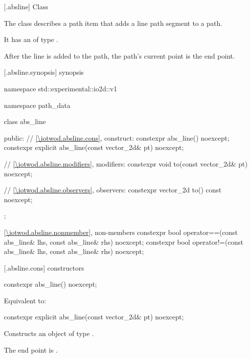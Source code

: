  [\iotwod.absline] {Class }

\pnum
{}%
The class  describes a path item that adds a line path segment to a path.

\pnum
It has an  of type .

\pnum
After the line is added to the path, the path's current point is the end point.

 [\iotwod.absline.synopsis] { synopsis}

\begin{codeblock}
namespace std::experimental::io2d::v1 {
  namespace path_data {
    class abs_line {
    public:
      // \ref{\iotwod.absline.cons}, construct:
      constexpr abs_line() noexcept;
      constexpr explicit abs_line(const vector_2d& pt) noexcept;

      // \ref{\iotwod.absline.modifiers}, modifiers:
      constexpr void to(const vector_2d& pt) noexcept;

      // \ref{\iotwod.absline.observers}, observers:
      constexpr vector_2d to() const noexcept;
    };
    
    \ref{\iotwod.absline.nonmember}, non-members
    constexpr bool operator==(const abs_line& lhs, const abs_line& rhs) 
      noexcept;
    constexpr bool operator!=(const abs_line& lhs, const abs_line& rhs) 
      noexcept;
  }
}
\end{codeblock}

 [\iotwod.absline.cons] { constructors}

%
\begin{itemdecl}
constexpr abs_line() noexcept;
\end{itemdecl}
\begin{itemdescr}
\pnum
\effects
Equivalent to: 
\end{itemdescr}

%
\begin{itemdecl}
constexpr explicit abs_line(const vector_2d& pt) noexcept;
\end{itemdecl}
\begin{itemdescr}
\pnum
\effects
Constructs an object of type .

\pnum
The end point is .
\end{itemdescr}

